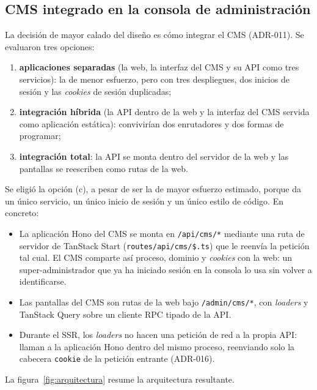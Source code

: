 \subsection{CMS integrado en la consola de administración}

La decisión de mayor calado del diseño es cómo integrar el CMS (ADR-011). Se
evaluaron tres opciones:

\begin{enumerate}[label=(\alph*)]
  \item \textbf{aplicaciones separadas} (la web, la interfaz del CMS y su
        API como tres servicios): la de menor esfuerzo, pero con tres
        despliegues, dos inicios de sesión y las \textit{cookies} de sesión
        duplicadas;
  \item \textbf{integración híbrida} (la API dentro de la web y la interfaz
        del CMS servida como aplicación estática): convivirían dos
        enrutadores y dos formas de programar;
  \item \textbf{integración total}: la API se monta dentro del servidor de
        la web y las pantallas se reescriben como rutas de la web.
\end{enumerate}

Se eligió la opción (c), a pesar de ser la de mayor esfuerzo estimado, porque
da un único servicio, un único inicio de sesión y un único estilo de código.
En concreto:

\begin{itemize}
  \item La aplicación Hono del CMS se monta en \texttt{/api/cms/*} mediante
        una ruta de servidor de TanStack Start (\texttt{routes/api/cms/\$.ts})
        que le reenvía la petición tal cual. El CMS comparte así proceso,
        dominio y \textit{cookies} con la web: un super-administrador que ya
        ha iniciado sesión en la consola lo usa sin volver a identificarse.
  \item Las pantallas del CMS son rutas de la web bajo
        \texttt{/admin/cms/*}, con \textit{loaders} y TanStack Query sobre un
        cliente RPC tipado de la API.
  \item Durante el SSR, los \textit{loaders} no hacen una petición de red a
        la propia API: llaman a la aplicación Hono dentro del mismo proceso,
        reenviando solo la cabecera \texttt{cookie} de la petición entrante
        (ADR-016).
\end{itemize}

La figura~\ref{fig:arquitectura} resume la arquitectura resultante.

